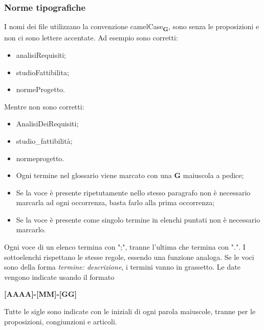         \subsubsection{Norme tipografiche}
            I nomi dei file utilizzano la convenzione camelCase\textsubscript{\textbf{G}}, sono senza le proposizioni e non ci sono lettere accentate.
            Ad esempio sono corretti:
            \begin{itemize}
                \item analisiRequisiti;
                \item studioFattibilita;
                \item normeProgetto.
            \end{itemize}
            Mentre non sono corretti:
            \begin{itemize}
                \item AnalisiDeiRequisiti;
                \item studio\_fattibilità;
                \item normeprogetto.
            \end{itemize}
            
            \begin{itemize}
                \item Ogni termine nel glossario viene marcato con una \textbf{G} maiuscola a pedice;
                \item Se la voce è presente ripetutamente nello stesso paragrafo non è necessario marcarla ad ogni occorrenza, basta farlo alla prima occorrenza;
                \item Se la voce è presente come singolo termine in elenchi puntati non è necessario marcarlo. 
            \end{itemize}
            
            Ogni voce di un elenco termina con ";", tranne l'ultima che termina con ".". I sottoelenchi rispettano le stesse regole, essendo una funzione analoga. Se le voci sono della forma \textit{termine: descrizione}, i termini vanno in grassetto.
            Le date vengono indicate usando il formato
            \begin{center}
                \textbf{[AAAA]-[MM]-[GG]}
            \end{center}
            Tutte le sigle sono indicate con le iniziali di ogni parola maiuscole, tranne per le proposizioni, congiunzioni e articoli.
